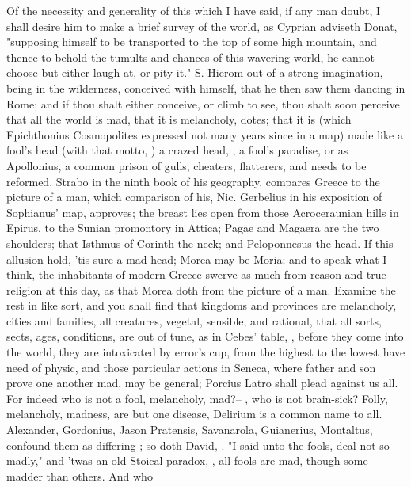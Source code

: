 Of the necessity and generality of this which I have said, if any man doubt, I
shall desire him to make a brief survey of the world, as
Cyprian adviseth Donat, "supposing himself to be
transported to the top of some high mountain, and thence to behold the tumults
and chances of this wavering world, he cannot choose but either laugh at, or
pity it." S. Hierom out of a strong imagination, being in the wilderness,
conceived with himself, that he then saw them dancing in Rome; and if thou
shalt either conceive, or climb to see, thou shalt soon perceive that all the
world is mad, that it is melancholy, dotes; that it is (which Epichthonius
Cosmopolites expressed not many years since in a map) made like a fool's head
(with that motto, ) a crazed head, , a fool's paradise, or as Apollonius, a common prison of gulls,
cheaters, flatterers, \etc{} and needs to be reformed. Strabo in the ninth book
of his geography, compares Greece to the picture of a man, which comparison of
his, Nic. Gerbelius in his exposition of Sophianus' map, approves; the breast
lies open from those Acroceraunian hills in Epirus, to the Sunian promontory in
Attica; Pagae and Magaera are the two shoulders; that Isthmus of Corinth the
neck; and Peloponnesus the head. If this allusion hold, 'tis sure a mad head;
Morea may be Moria; and to speak what I think, the inhabitants of modern Greece
swerve as much from reason and true religion at this day, as that Morea doth
from the picture of a man. Examine the rest in like sort, and you shall find
that kingdoms and provinces are melancholy, cities and families, all creatures,
vegetal, sensible, and rational, that all sorts, sects, ages, conditions, are
out of tune, as in Cebes' table, , before they come
into the world, they are intoxicated by error's cup, from the highest to the
lowest have need of physic, and those particular actions in
Seneca, where father and son prove one another mad, may be
general; Porcius Latro shall plead against us all. For indeed who is not a
fool, melancholy, mad?-- , who
is not brain-sick? Folly, melancholy, madness, are but one disease, Delirium is
a common name to all. Alexander, Gordonius, Jason Pratensis, Savanarola,
Guianerius, Montaltus, confound them as differing ;
so doth David, . "I said unto the fools, deal not
so madly," and 'twas an old Stoical paradox, ,
all fools are mad, though some madder than others. And who

